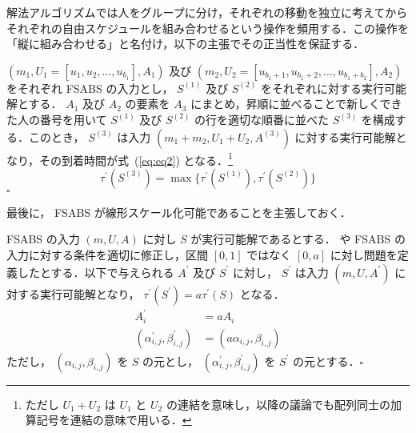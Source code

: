 解法アルゴリズムでは人をグループに分け，それぞれの移動を独立に考えてからそれぞれの自由スケジュールを組み合わせるという操作を頻用する．この操作を「縦に組み合わせる」と名付け，以下の主張でその正当性を保証する．
\begin{claim}\label{claim:vertical-composition}
  $(m_1, U_1 = [u_1, u_2, \ldots, u_{b_1}], A_1)$ 及び $(m_2, U_2 = [u_{b_1+1}, u_{b_1+2}, \ldots, u_{b_1+b_2}], A_2)$ をそれぞれ FSABS の入力とし， $S^{(1)}$ 及び $S^{(2)}$ をそれぞれに対する実行可能解とする． $A_1$ 及び $A_2$ の要素を $A_3$ にまとめ，昇順に並べることで新しくできた人の番号を用いて $S^{(1)}$ 及び $S^{(2)}$ の行を適切な順番に並べた $S^{(3)}$ を構成する．このとき， $S^{(3)}$ は入力 $(m_1 + m_2, U_1 + U_2, A^{(3)})$ に対する実行可能解となり，その到着時間が式~(\ref{eq:eq2}) となる．\footnote{ただし $U_1 + U_2$ は $U_1$ と $U_2$ の連結を意味し，以降の議論でも配列同士の加算記号を連結の意味で用いる．}
  \begin{equation}
    \tau^\prime(S^{(3)}) = \max \{ \tau^\prime(S^{(1)}), \tau^\prime(S^{(2)}) \}\label{eq:eq2}
  \end{equation}
  \hfill $\square$
\end{claim}

最後に， FSABS が線形スケール化可能であることを主張しておく．
\begin{claim}\label{claim:fsabs-scalable}
  FSABS の入力 $(m, U, A)$ に対し $S$ が実行可能解であるとする．  や FSABS の入力に対する条件を適切に修正し，区間 $[0, 1]$ ではなく $[0, a]$ に対し問題を定義したとする．以下で与えられる $A^\prime$ 及び $S^\prime$ に対し， $S^\prime$ は入力 $(m, U, A^\prime)$ に対する実行可能解となり， $\tau^\prime(S^\prime) = a\tau^\prime(S)$ となる．
  \begin{align}
    A^\prime_i &= aA_i \\
    (\alpha^\prime_{i,j},\beta^\prime_{i,j}) &= (a\alpha_{i,j},\beta_{i,j})
  \end{align}
  ただし， $(\alpha_{i,j},\beta_{i,j})$ を $S$ の元とし， $(\alpha^\prime_{i,j},\beta^\prime_{i,j})$ を $S^\prime$ の元とする．\hfill $\square$
\end{claim}